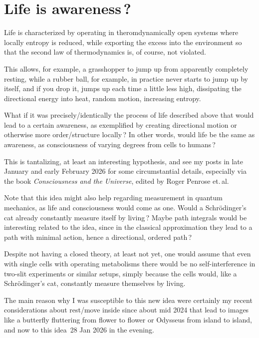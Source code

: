 



\avantgarde

\section{Life is awareness\,?}

Life is characterized by operating in theromdynamically open systems
where locally entropy is reduced,
while exporting the excess into the environment
so that the second law of thermodynamics is, of course, not violated.

This allows, for example,
a grasshopper to jump up from apparently completely resting,
while a rubber ball, for example,
in practice never starts to jump up by itself,
and if you drop it,
jumps up each time a little less high,
dissipating the directional energy into heat, random motion, increasing entropy.

{\color{xphi}What if it was precisely/identically the process of life described above
that would lead to a certain awareness,
as exemplified by creating directional motion or otherwise more order/structure locally\,?
%
In other words,
would life be the same as awareness,
as consciousness of varying degrees from cells to humans\,?}

This is tantalizing, at least an interesting hypothesis,
and see my posts in late January and early February 2026
for some circumstantial details,
especially via the book \textsl{Consciousness and the Universe}\raisebox{0.2ex}{\smaller*}$\!$,
edited by Roger Penrose et.\,al.

Note that this idea might also help regarding measurement in quantum mechanics,
as life and consciousness would come as one.
%
Would a Schrödinger’s cat already constantly measure itself by living\,?
%
Maybe path integrals would be interesting related to the idea,
since in the classical approximation they lead to a path with minimal action,
hence a directional, ordered path\,?

Despite not having a closed theory,
at least not yet,
one would assume that even with single cells with operating metabolisms
there would be no self-interference in two-slit experiments or similar setups,
simply because the cells would, like a Schrödinger’s cat, constantly measure themselves by living.

The main reason why I was susceptible to this new idea
were certainly my recent considerations about rest/move inside
since about mid 2024
that lead to images like a butterfly fluttering from flower to flower
or Odysseus from island to island,
and now to this idea \raisebox{0.5ex}{\texttildelow}\,28 Jan 2026 in the evening.

